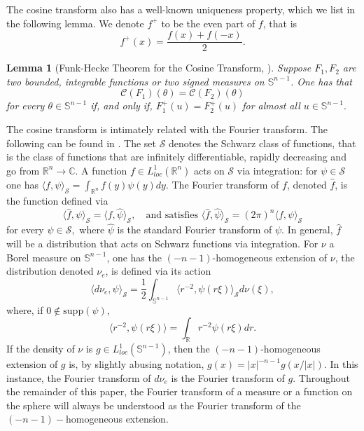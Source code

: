 \documentclass[11pt]{amsart}
\newtheorem{lemma}[theorem]{Lemma}
\theoremstyle{definition}
\theoremstyle{remark}
\numberwithin{equation}{section}
\newcommand{\R}{\mathbb{R}}
\newcommand{\s}{\mathbb{S}}
\newcommand{\ct}[2]{\mathcal{C}({#1})({#2})}
\begin{document}
The cosine transform also has a well-known uniqueness property, which we list in the following lemma. We denote $f^+$ to be the even part of $f$, that is $$f^+(x)=\frac{f(x)+f(-x)}{2}.$$
\begin{lemma}[Funk-Hecke Theorem for the Cosine Transform, \cite{Gr}]
\label{l:funk}
Suppose $F_1,F_2$ are two bounded, integrable functions or two signed measures on $\s^{n-1}$. One has that $$\ct{F_1}{\theta}=\ct{F_2}{\theta}$$
for every $\theta\in\s^{n-1}$ if, and only if, $F_1^+(u)=F_2^+(u)$ for almost all $u\in\s^{n-1}.$
\end{lemma}

The cosine transform is intimately related with the Fourier transform. The following can be found in \cite{AK05,KRZ04_1,KRZ04_2, KY08}. The set $\mathcal{S}$ denotes the Schwarz class of functions, that is the class of functions that are infinitely differentiable, rapidly decreasing and go from $\R^n\to\mathbb{C}.$ A function $f\in L^1_{loc}(\R^n)$ acts on $\mathcal{S}$ via integration: for $\psi\in\mathcal{S}$ one has $\langle f,\psi\rangle_{\mathcal{S}}=\int_{\R^n}f(y)\psi(y)dy.$ The Fourier transform of $f$, denoted $\widehat{f}$, is the function defined via
$$\langle \widehat{f},\psi\rangle_{\mathcal{S}}=\langle f,\widehat{\psi}\rangle_{\mathcal{S}},\quad \text{and satisfies }\langle \widehat{f},\widehat{\psi}\rangle_{\mathcal{S}}=(2\pi)^n\langle f,\psi\rangle_{\mathcal{S}}$$ for every $\psi\in\mathcal{S},$ where $\widehat{\psi}$ is the standard Fourier transform of $\psi$. In general, $\widehat{f}$ will be a distribution that acts on Schwarz functions via integration. For $\nu$ a Borel measure on $\s^{n-1}$, one has the $(-n-1)$-homogeneous extension of $\nu$, the distribution denoted $\nu_e$, is defined via its action
$$\langle d\nu_e,\psi\rangle_{\mathcal{S}}=\frac{1}{2}\int_{\s^{n-1}}\langle r^{-2},\psi(r\xi)\rangle_{\mathcal{S}}d\nu(\xi),$$
where, if $0\notin \text{supp}(\psi)$,
$$\langle r^{-2},\psi(r\xi)\rangle=\int_{\R}r^{-2}\psi(r\xi)dr.$$
If the density of $\nu$ is $g\in L^1_{loc}(\s^{n-1})$, then the $(-n-1)$-homogeneous extension of $g$ is, by slightly abusing notation, $g(x)=|x|^{-n-1}g(x/|x|)$. In this instance, the Fourier transform of $d\nu_e$ is the Fourier transform of $g.$ Throughout the remainder of this paper, the Fourier transform of a measure or a function on the sphere will always be understood as the Fourier transform of the $(-n-1)-$homogeneous extension.
\end{document}

